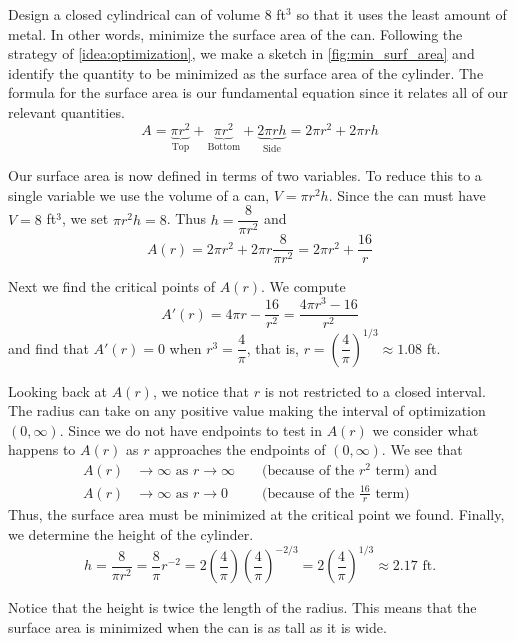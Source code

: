 \begin{example}\label{ex_min_surf_area}%
Design a closed cylindrical can of volume $8$ ft$^3$ so that it uses the least amount of metal. In other words, minimize the surface area of the can.
Following the strategy of \autoref{idea:optimization}, we make a sketch in \autoref{fig:min_surf_area} and identify the quantity to be minimized as the surface area of the cylinder. The formula for the surface area is our fundamental equation  since it relates all of our relevant quantities.
\[
 A
 =\underbrace{\pi r^2}_{\text{Top}}
 +\underbrace{\pi r^2}_{\text{Bottom}}
 +\underbrace{2\pi rh}_{\text{Side}}
 =2\pi r^2+2\pi rh
\]

Our surface area is now defined in terms of two variables. To reduce this to a single variable we use the volume of a can, $V=\pi r^2h$. Since the can must have $V=8$ ft$^3$, we set $\pi r^2h=8$. Thus $h=\dfrac8{\pi r^2}$ and
\[A(r)=2\pi r^2+2\pi r\frac8{\pi r^2}=2\pi r^2+\frac{16}{r}\]

Next we find the critical points of $A(r)$. We compute
\[A'(r)=4\pi r-\dfrac{16}{r^2}=\dfrac{4\pi r^3-16}{r^2}\]
and find that $A'(r)=0$ when $r^3=\dfrac4\pi$, that is, $r=\left(\dfrac4\pi\right)^{1/3}\approx 1.08$ ft.

Looking back at $A(r)$, we notice that $r$ is not restricted to a closed interval. The radius can take on any positive value making the interval of optimization $(0, \infty)$. Since we do not have endpoints to test in $A(r)$ we consider what happens to $A(r)$ as $r$ approaches the endpoints of $(0, \infty)$. We see that
\begin{align*}
	A(r) &\to\infty\text{ as }r\to\infty&&\text{ (because of the $r^2$ term) and}\\
	A(r) &\to\infty\text{ as }r\to0&&\text{ (because of the $\frac{16}{r}$ term)}
\end{align*}
Thus, the surface area must be minimized at the critical point we found. Finally, we determine the height of the cylinder.
\[
 h
 =\frac8{\pi r^2}
 =\frac8\pi r^{-2}
 =2\left(\frac4\pi\right)\left(\frac4\pi\right)^{-2/3}
 =2\left(\frac4\pi\right)^{1/3}
 \approx 2.17\text{ ft.}
\]

Notice that the height is twice the length of the radius. This means that the surface area is minimized when the can is as tall as it is wide.
\end{example}

